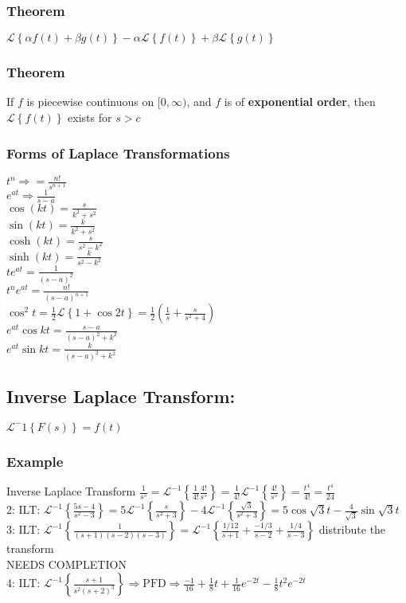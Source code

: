 \documentclass{article}
\begin{document}
\subsubsection{Theorem}
$\mathscr{L}\left\{\alpha f(t) + \beta g(t)\right\}-\alpha\mathscr{L}\left\{f(t)\right\}+\beta\mathscr{L}\left\{g(t)\right\}$
\subsubsection{Theorem}
If $f$ is piecewise continuous on $[0,\infty)$, and $f$ is of \textbf{exponential order}, then $\mathscr{L}\left\{f(t)\right\}$ exists for $s>c$
\subsubsection{Forms of Laplace Transformations}
$t^n \Rightarrow = \frac{n!}{s^{n+1}}$
\\ $e^{at} \Rightarrow \frac{1}{s-a}$
\\ $\cos(kt) = \frac{s}{k^2+s^2}$
\\ $\sin(kt) = \frac{k}{k^2+s^2}$
\\ $\cosh(kt) = \frac{s}{s^2-k^2}$
\\ $\sinh(kt) = \frac{k}{s^2-k^2}$
\\ $te^{at} = \frac{1}{(s-a)^2}$
\\ $t^ne^{at} = \frac{n!}{(s-a)^{n+1}}$
\\ $\cos^2t=\frac{1}{2} \mathscr{L} \left\{1+\cos 2t \right\} = \frac{1}{2}\left(\frac{1}{s}+\frac{s}{s^2+4}\right)$
\\ $e^{at}\cos kt = \frac{s-a}{(s-a)^2+k^2}$
\\ $e^{at}\sin kt = \frac{k}{(s-a)^2+k^2}$

\subsection{Inverse Laplace Transform:}
$\mathscr{L}^-1 \left\{F(s)\right\}=f(t)$

\subsubsection{Example}
Inverse Laplace Transform $\frac{1}{s^5}=\mathscr{L}^{-1}\left\{\frac{1}{4!}\frac{4!}{s^5}\right\}=\frac{1}{4!}\mathscr{L}^{-1}\left\{\frac{4!}{s^5}\right\}=\frac{t^4}{4!}=\frac{t^4}{24}$
\\ 2: ILT: $\mathscr{L}^{-1}\left\{\frac{5s-4}{s^2-3}\right\}=5\mathscr{L}^{-1}\left\{\frac{s}{s^2+3}\right\}-4\mathscr{L}^{-1}\left\{\frac{\sqrt{3}}{s^2+3}\right\}=5\cos\sqrt{3}t-\frac{4}{\sqrt{3}}\sin\sqrt{3}t$
\\ 3: ILT: $\mathscr{L}^{-1}\left\{\frac{1}{(s+1)(s-2)(s-3)}\right\}=\mathscr{L}^{-1}\left\{\frac{1/12}{s+1}+\frac{-1/3}{s-2}+\frac{1/4}{s-3}\right\}$ distribute the transform 
\\ NEEDS COMPLETION
\\ 4: ILT: $\mathscr{L}^{-1}\left\{\frac{s+1}{s^2(s+2)^3}\right\} \Rightarrow \text{PFD} \Rightarrow \frac{-1}{16}+\frac{1}{8}t+\frac{1}{16}e^{-2t}-\frac{1}{8}t^2e^{-2t}$
\end{document}
